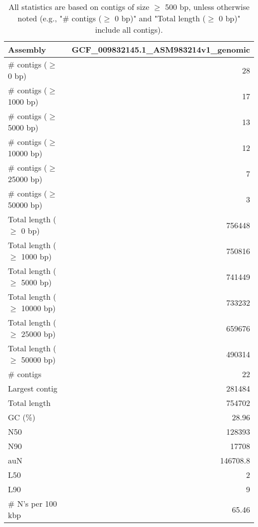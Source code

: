 \documentclass[12pt,a4paper]{article}
\begin{document}
\begin{table}[ht]
\begin{center}
\caption{All statistics are based on contigs of size $\geq$ 500 bp, unless otherwise noted (e.g., "\# contigs ($\geq$ 0 bp)" and "Total length ($\geq$ 0 bp)" include all contigs).}
\begin{tabular}{|l*{1}{|r}|}
\hline
Assembly & GCF\_009832145.1\_ASM983214v1\_genomic \\ \hline
\# contigs ($\geq$ 0 bp) & 28 \\ \hline
\# contigs ($\geq$ 1000 bp) & 17 \\ \hline
\# contigs ($\geq$ 5000 bp) & 13 \\ \hline
\# contigs ($\geq$ 10000 bp) & 12 \\ \hline
\# contigs ($\geq$ 25000 bp) & 7 \\ \hline
\# contigs ($\geq$ 50000 bp) & 3 \\ \hline
Total length ($\geq$ 0 bp) & 756448 \\ \hline
Total length ($\geq$ 1000 bp) & 750816 \\ \hline
Total length ($\geq$ 5000 bp) & 741449 \\ \hline
Total length ($\geq$ 10000 bp) & 733232 \\ \hline
Total length ($\geq$ 25000 bp) & 659676 \\ \hline
Total length ($\geq$ 50000 bp) & 490314 \\ \hline
\# contigs & 22 \\ \hline
Largest contig & 281484 \\ \hline
Total length & 754702 \\ \hline
GC (\%) & 28.96 \\ \hline
N50 & 128393 \\ \hline
N90 & 17708 \\ \hline
auN & 146708.8 \\ \hline
L50 & 2 \\ \hline
L90 & 9 \\ \hline
\# N's per 100 kbp & 65.46 \\ \hline
\end{tabular}
\end{center}
\end{table}
\end{document}
